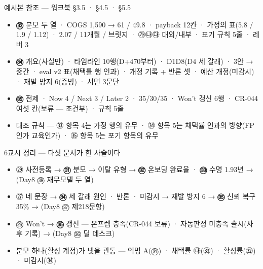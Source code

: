 \begin{frame}{예시본 참조 — 워크북 §3.5 · §4.5 · §5.5}
\begin{itemize}
\item \textbf{㉝} 분모 두 열 · COGS 1,590 → 61 / 49.8 · payback 12칸 · 가정의 표(5.8 / 1.9 / 1.12) · 2.07 / 11개월 / 브릿지 · ㉮㉯㉰ 대외/내부 · 표기 규칙 5줄 · 레버 3
\item \textbf{㉞} 개요(사실만) · 타임라인 10행(D+470부터) · D1\til{}D8(D4 세 갈래) · 3안 → 중간 · eval v2 표(채택률 행 인과) · 개정 기록 + 반론 셋 · 예산 개정(미감시) · 재발 방지 6(증빙) · 서면 3문단
\item \textbf{㉟} 전제 · Now 4 / Next 3 / Later 2 · 35/30/35 · Won't 갱신 6행 · CR-044 여섯 칸(보류 — 조건부) · 규칙 5줄
\item 대조 규칙 — ㉝ 항목 4는 가정 행의 유무 · ㉞ 항목 5는 채택률 인과의 방향(FP인가 교육인가) · ㉟ 항목 5는 포기 항목의 유무
\end{itemize}
\end{frame}

\begin{frame}{6교시 정리 — 다섯 문서가 한 사슬이다}
\begin{itemize}
\item ㉙ 사전등록 → \textbf{㉛} 분모 → 이탈 유형 → \textbf{㉜} 온보딩 완료율 · \textbf{㉝} 수명 1.93년 → (Day8 ㊳ 재무모델 두 열)
\item ㉗ 네 문장 → \textbf{㉞} 세 갈래 원인 · 반론 · 미감시 → 재발 방지 6 → \textbf{㉟} 신뢰 복구 35\% → (Day8 ㊲ 제218문항)
\item ㉖ Won't → \textbf{㉟} 갱신 — 온프렘 충족(CR-044 보류) · 자동판정 미충족 출시(사후 기록) → (Day8 ㊱ 딜 데스크)
\item 분모 하나(활성 계정)가 넷을 관통 — 익명 A(㉛) · 채택률 ㉰(㉝) · 활성률(㉜) · 미감시(㉞)
\end{itemize}
\end{frame}

